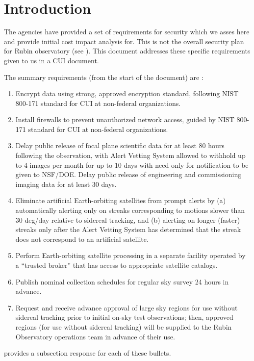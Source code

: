 \section{Introduction}

The agencies have provided a set of requirements for security which we asses here and provide initial cost impact analysis for.  This is not the overall security plan for Rubin observatory (see ).
This document addresses these specific requirements given to us in a CUI document.

The summary requirements (from the start of the document) are :
\begin{enumerate}

\item	Encrypt data using strong, approved encryption standard, following NIST 800-171 standard for CUI at non-federal organizations.
\item	Install firewalls to prevent unauthorized network access, guided by NIST 800-171 standard for CUI at non-federal organizations.
\item	Delay public release of focal plane scientific data for at least 80 hours following the observation, with Alert Vetting System allowed to withhold up to 4 images per month for up to 10 days with need only for notification to be given to NSF/DOE. Delay public release of engineering and commissioning imaging data for at least 30 days.
\item	Eliminate artificial Earth-orbiting satellites from prompt alerts by (a) automatically alerting only on streaks corresponding to motions slower than 30 deg/day relative to sidereal tracking, and (b) alerting on longer (faster) streaks only after the Alert Vetting System has determined that the streak does not correspond to an artificial satellite.
\item	Perform Earth-orbiting satellite processing in a separate facility operated by a “trusted broker” that has access to appropriate satellite catalogs.
\item	Publish nominal collection schedules for regular sky survey 24 hours in advance.
\item	Request and receive advance approval of large sky regions for use without sidereal tracking prior to initial on-sky test observations; then, approved regions (for use without sidereal tracking) will be supplied to the Rubin Observatory operations team in advance of their use.

\end{enumerate}


 provides a subsection response for each of these bullets.
